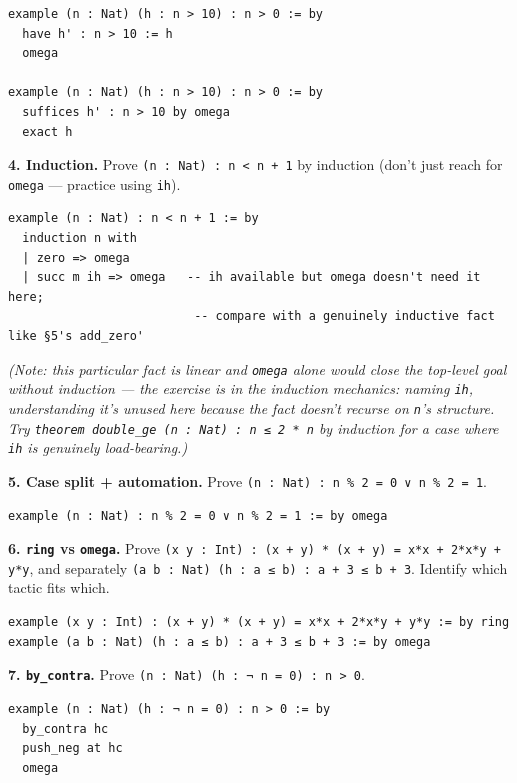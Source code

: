 \begin{verbatim}
example (n : Nat) (h : n > 10) : n > 0 := by
  have h' : n > 10 := h
  omega

example (n : Nat) (h : n > 10) : n > 0 := by
  suffices h' : n > 10 by omega
  exact h
\end{verbatim}

\textbf{4. Induction.} Prove \texttt{(n : Nat) : n < n + 1} by induction (don't just reach for \texttt{omega} --- practice using \texttt{ih}).

\begin{verbatim}
example (n : Nat) : n < n + 1 := by
  induction n with
  | zero => omega
  | succ m ih => omega   -- ih available but omega doesn't need it here;
                          -- compare with a genuinely inductive fact like §5's add_zero'
\end{verbatim}

\emph{(Note: this particular fact is linear and \texttt{omega} alone would close the top-level goal without induction --- the exercise is in the induction mechanics: naming \texttt{ih}, understanding it's unused here because the fact doesn't recurse on \texttt{n}'s structure. Try \texttt{theorem double\_ge (n : Nat) : n ≤ 2 * n} by induction for a case where \texttt{ih} is genuinely load-bearing.)}

\textbf{5. Case split + automation.} Prove \texttt{(n : Nat) : n \% 2 = 0 ∨ n \% 2 = 1}.

\begin{verbatim}
example (n : Nat) : n % 2 = 0 ∨ n % 2 = 1 := by omega
\end{verbatim}

\textbf{6. \texttt{ring} vs \texttt{omega}.} Prove \texttt{(x y : Int) : (x + y) * (x + y) = x*x + 2*x*y + y*y}, and separately \texttt{(a b : Nat) (h : a ≤ b) : a + 3 ≤ b + 3}. Identify which tactic fits which.

\begin{verbatim}
example (x y : Int) : (x + y) * (x + y) = x*x + 2*x*y + y*y := by ring
example (a b : Nat) (h : a ≤ b) : a + 3 ≤ b + 3 := by omega
\end{verbatim}

\textbf{7. \texttt{by\_contra}.} Prove \texttt{(n : Nat) (h : ¬ n = 0) : n > 0}.

\begin{verbatim}
example (n : Nat) (h : ¬ n = 0) : n > 0 := by
  by_contra hc
  push_neg at hc
  omega
\end{verbatim}


